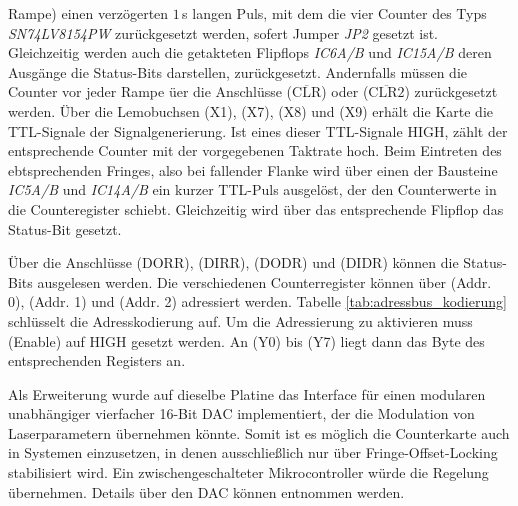 Rampe) einen verzögerten $1\,$\textmu s langen Puls, mit dem die vier Counter
des Typs \textit{SN74LV8154PW} zurückgesetzt werden, sofert Jumper \textit{JP2} gesetzt
ist. Gleichzeitig werden auch die getakteten Flipflops \textit{IC6A/B}
und \textit{IC15A/B} deren Ausgänge die Status-Bits darstellen, zurückgesetzt.
Andernfalls müssen die Counter vor jeder Rampe üer die Anschlüsse
($\overline{\text{CLR}}$) oder ($\overline{\text{CLR2}}$) zurückgesetzt werden.
Über die Lemobuchsen (X1), (X7), (X8) und (X9) erhält die Karte die TTL-Signale
der Signalgenerierung. Ist eines dieser TTL-Signale HIGH, zählt der
entsprechende Counter mit der vorgegebenen Taktrate hoch. Beim Eintreten des
ebtsprechenden Fringes, also bei fallender Flanke wird über einen der Bausteine
\textit{IC5A/B} und \textit{IC14A/B} ein kurzer TTL-Puls ausgelöst, der den
Counterwerte in die Counteregister schiebt. Gleichzeitig wird über das
entsprechende Flipflop das Status-Bit gesetzt.\par
Über die Anschlüsse (DORR), (DIRR), (DODR) und (DIDR) können die Status-Bits
ausgelesen werden. Die verschiedenen Counterregister können über (Addr. 0),
(Addr. 1) und (Addr. 2) adressiert werden. Tabelle
\ref{tab:adressbus_kodierung} schlüsselt die Adresskodierung auf. Um die
Adressierung zu aktivieren muss (Enable) auf HIGH gesetzt werden. An (Y0) bis (Y7) liegt dann das Byte des entsprechenden Registers an.\par
Als Erweiterung wurde auf dieselbe Platine das Interface für einen modularen
unabhängiger vierfacher 16-Bit DAC implementiert, der die Modulation von Laserparametern übernehmen
könnte. Somit ist es möglich die Counterkarte auch in Systemen einzusetzen, in
denen ausschließlich nur über Fringe-Offset-Locking stabilisiert wird. Ein
zwischengeschalteter Mikrocontroller würde die Regelung übernehmen. Details über
den DAC können \cite{counterkarte_laserstabilisierung} entnommen werden.
